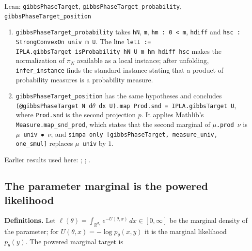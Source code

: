 \documentclass[11pt,a4paper]{report}
\begin{document}
\begin{leanbox}{Lean: \texttt{gibbsPhaseTarget}, \texttt{gibbsPhaseTarget\_\allowbreak{}probability}, \texttt{gibbsPhaseTarget\_\allowbreak{}position}}
\begin{enumerate}


\item \texttt{gibbs\allowbreak{}Phase\allowbreak{}Target\_\allowbreak{}probability} takes \texttt{h\allowbreak{}N}, \texttt{m}, \texttt{hm : 0 < m}, \texttt{hdiff} and \texttt{hsc : Strong\allowbreak{}Convex\allowbreak{}On univ m U}. The line \texttt{let\allowbreak{}I := IPLA.\allowbreak{}gibbs\allowbreak{}Target\_\allowbreak{}is\allowbreak{}Probability h\allowbreak{}N U m hm hdiff hsc} makes the normalization of \(\pi_N\) available as a local instance; after unfolding, \texttt{infer\_\allowbreak{}instance} finds the standard instance stating that a product of probability measures is a probability measure.

\item \texttt{gibbs\allowbreak{}Phase\allowbreak{}Target\_\allowbreak{}position} has the same hypotheses and concludes \texttt{(@gibbs\allowbreak{}Phase\allowbreak{}Target N d\ensuremath{\theta} dx U).\allowbreak{}map Prod.\allowbreak{}snd = IPLA.\allowbreak{}gibbs\allowbreak{}Target U}, where \texttt{Prod.\allowbreak{}snd} is the second projection \(p\). It applies Mathlib's \texttt{Measure.\allowbreak{}map\_\allowbreak{}snd\_\allowbreak{}prod}, which states that the second marginal of \texttt{\ensuremath{\mu}.\allowbreak{}prod \ensuremath{\nu}} is \texttt{\ensuremath{\mu} univ \ensuremath{\bullet} \ensuremath{\nu}}, and \texttt{simpa only [gibbs\allowbreak{}Phase\allowbreak{}Target, measure\_\allowbreak{}univ, one\_\allowbreak{}smul]} replaces \texttt{\ensuremath{\mu} univ} by \(1\).

\end{enumerate}
\end{leanbox}


Earlier results used here: \cite[Section~3.1.1]{LangevinLean2026IPLA}; \cite[Section~3.3.2]{LangevinLean2026IPLA}; \cite[Section~3.5.1]{LangevinLean2026IPLA}.
\subsection{\texorpdfstring{The parameter marginal is the powered likelihood}{The parameter marginal is the powered likelihood}}
\label{report-step-KIPLMC-Target-lean-3}


\textbf{Definitions.} Let \(\ell(\theta)=\int_{\mathbb R^{d_x}}e^{-U(\theta,x)}\,dx\in[0,\infty]\) be the marginal density of the parameter; for \(U(\theta,x)=-\log p_\theta(x,y)\) it is the marginal likelihood \(p_\theta(y)\). The powered marginal target is
\end{document}
